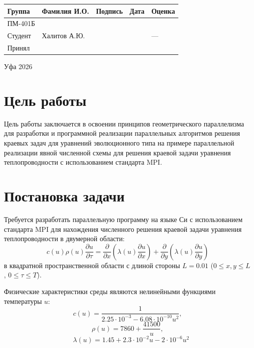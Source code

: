 \begin{titlepage}
		\vfill
		\vspace{1cm}
		\noindent
		\begin{table}[H]
			\hspace{-0.8cm}
			\renewcommand{\arraystretch}{1.5} 
			\begin{tabular}{|C{3.1cm}|C{4cm}|C{2.4cm}|C{2.2cm}|C{3.2cm}|}
				\hline
				Группа & Фамилия И.О. & Подпись & Дата & Оценка \\ \hline
				ПМ-401Б & & & & \\ \hline
				Студент & Халитов А.Ю. & & & --- \\ \hline
				Принял &  & & & \\ \hline
			\end{tabular}
		\end{table}
		\vspace{0.25cm}
		Уфа 2026
	\end{titlepage}

	
	\newpage
	
	\section{Цель работы}
	Цель работы заключается в освоении принципов геометрического параллелизма для разработки и программной реализации параллельных алгоритмов решения краевых задач для уравнений эволюционного типа на примере параллельной реализации явной численной схемы для решения краевой задачи уравнения теплопроводности с использованием стандарта MPI.
	
	\section{Постановка задачи}
	Требуется разработать параллельную программу на языке Си с использованием стандарта MPI для нахождения численного решения краевой задачи уравнения теплопроводности в двумерной области:
	\[ c(u)\rho(u)\frac{\partial u}{\partial \tau} = \frac{\partial}{\partial x}\left(\lambda(u)\frac{\partial u}{\partial x}\right) + \frac{\partial}{\partial y}\left(\lambda(u)\frac{\partial u}{\partial y}\right) \]
	в квадратной пространственной области с длиной стороны $L = 0.01$ ($0 \le x, y \le L$, $0 \le \tau \le T$).
	
	Физические характеристики среды являются нелинейными функциями температуры $u$:
	\[ c(u) = \frac{1}{2.25 \cdot 10^{-3} - 6.08 \cdot 10^{-10} u^2},\]
	\[ \rho(u) = 7860 + \frac{41500}{u}, \]
	\[\quad \lambda(u) = 1.45 + 2.3 \cdot 10^{-2} u - 2 \cdot 10^{-6} u^2 \]
	
